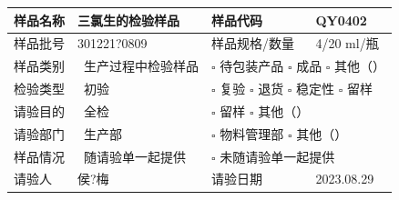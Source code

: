 \documentclass[UTF8,10pt,a4paper,fontset=fandol]{ctexart}
\renewcommand{\arraystretch}{1.15}
\newcommand{\fieldvalue}[1]{#1}
\newcommand{\handwritten}[1]{#1}
\begin{document}
\begin{center}
\renewcommand{\arraystretch}{1.45}
\small
\begin{tabularx}{\textwidth}{|p{2.5cm}|X|p{2.5cm}|X|}
\hline
样品名称 &
\fieldvalue{\handwritten{三氯生的检验样品}} &
样品代码 &
\fieldvalue{QY0402}
\\ \hline

样品批号 &
\fieldvalue{\handwritten{301221?0809}} &
样品规格/数量 &
\fieldvalue{\handwritten{4/20 ml/瓶}}
\\ \hline

样品类别 &
\fieldvalue{\checkmark\ 生产过程中检验样品}
&
\multicolumn{2}{l|}{%
\(\square\) 待包装产品\qquad
\(\square\) 成品\qquad
\(\square\) 其他（\hspace{1.2cm}）}
\\ \hline

检验类型 &
\fieldvalue{\checkmark\ 初验}
&
\multicolumn{2}{l|}{%
\(\square\) 复验\qquad
\(\square\) 退货\qquad
\(\square\) 稳定性\qquad
\(\square\) 留样}
\\ \hline

请验目的 &
\fieldvalue{\checkmark\ 全检}
&
\multicolumn{2}{l|}{%
\(\square\) 留样\qquad
\(\square\) 其他（\hspace{2.2cm}）}
\\ \hline

请验部门 &
\fieldvalue{\checkmark\ 生产部}
&
\multicolumn{2}{l|}{%
\(\square\) 物料管理部\qquad
\(\square\) 其他（\hspace{1.6cm}）}
\\ \hline

样品情况 &
\fieldvalue{\checkmark\ 随请验单一起提供}
&
\multicolumn{2}{l|}{%
\(\square\) 未随请验单一起提供}
\\ \hline

请验人 &
\fieldvalue{\handwritten{侯?梅}}
&
请验日期 &
\fieldvalue{\handwritten{2023.08.29}}
\\ \hline


\end{tabularx}
\end{center}
\end{document}
